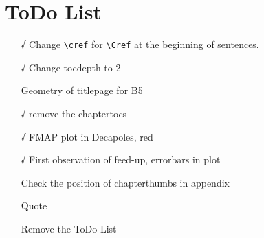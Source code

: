 \chapter*{ToDo List}

\begin{itemize}
    \tightlist
    \item[√] Change \verb|\cref| for \verb|\Cref| at the beginning of sentences.
    \item[√] Change tocdepth to 2
    \item[ ] Geometry of titlepage for B5
    \item[√] remove the chaptertocs
    \item[√] FMAP plot in Decapoles, red
    \item[√] First observation of feed-up, errorbars in plot
    \item[ ] Check the position of chapterthumbs in appendix
    \item[ ] Quote
    \item[ ] Remove the ToDo List
\end{itemize}